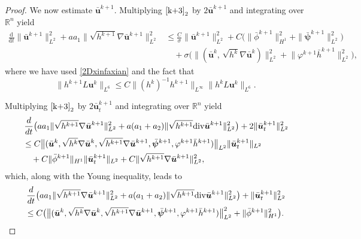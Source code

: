 \documentclass[10pt,a4paper]{amsart}
\begin{document}
\begin{proof}
We now estimate  $\bar{\boldsymbol{u}}^{k+1}$. Multiplying $\eqref{k+3}_2$ by $2\bar{\boldsymbol{u}}^{k+1}$ and integrating over $\mathbb{R}^n$ yield 
\begin{equation}\label{ubar}
\begin{aligned}
\frac{\mathrm{d}}{\mathrm{d}t}\|\bar{\boldsymbol{u}}^{k+1}\|^2_{L^2}\!+\!aa_1\|\sqrt{h^{k+1}}\nabla\bar{\boldsymbol{u}}^{k+1}\|^2_{L^2}&\leq \frac{C}{\sigma}\|\bar{\boldsymbol{u}}^{k+1}\|^2_{L^2}+C\big(\|\bar{\phi}^{k+1}\|^2_{H^1}+\|\bar{\boldsymbol{\psi}}^{k+1}\|^2_{L^2}\big)\\
&\quad +\sigma\big(\|(\bar{\boldsymbol{u}}^{k},\,\sqrt{h^{k}}\nabla\bar{\boldsymbol{u}}^{k})\|^2_{L^2}\!+\!\|\varphi^{k+1}\bar{h}^{k+1}\|^2_{L^2}\big),
\end{aligned}
\end{equation}
where we have used \eqref{2Dxinfaxian} and the fact that
\begin{equation*}
\|h^{k+1}L\boldsymbol{u}^k\|_{L^6}\leq C\|(h^k)^{-1}h^{k+1}\|_{L^\infty}\|h^{k}L\boldsymbol{u}^k\|_{L^6}.    
\end{equation*} 

Multiplying $\eqref{k+3}_2$ by $2\bar{\boldsymbol{u}}_t^{k+1}$ and integrating over $\mathbb{R}^n$ yield 
\begin{equation*} 
\begin{aligned}
&\,\frac{\rm d}{{\rm d}t}\big(a a_1\|\sqrt{h^{k+1}}\nabla\bar{\boldsymbol{u}}^{k+1}\|^2_{L^2}
+a(a_1+a_2)\|\sqrt{h^{k+1}}\mathrm{div}\bar{\boldsymbol{u}}^{k+1}\|^2_{L^2}\big)+2\|\bar{\boldsymbol{u}}^{k+1}_t\|^2_{L^2}\\
&\leq C\big\|(\bar{\boldsymbol{u}}^k,\sqrt{h^k}\nabla\bar{\boldsymbol{u}}^k,\sqrt{h^{k+1}}\nabla\bar{\boldsymbol{u}}^{k+1},\bar{\boldsymbol{\psi}}^{k+1},\varphi^{k+1}\bar{h}^{k+1})\big\|_{L^2}\|\bar{\boldsymbol{u}}^{k+1}_t\|_{L^2}\\
&\quad +C\|\bar{\phi}^{k+1}\|_{H^1} \|\bar{\boldsymbol{u}}^{k+1}_t\|_{L^2} +C\|\sqrt{h^{k+1}}\nabla\bar{\boldsymbol{u}}^{k+1}\|_{L^2}^2,
\end{aligned}
\end{equation*}
which, along with the Young inequality, leads to
\begin{equation}\label{hubar}
\begin{aligned}
&\,\frac{\rm d}{{\rm d}t}\big(a a_1\|\sqrt{h^{k+1}}\nabla\bar{\boldsymbol{u}}^{k+1}\|^2_{L^2}
+a(a_1+a_2)\|\sqrt{h^{k+1}}\mathrm{div}\bar{\boldsymbol{u}}^{k+1}\|^2_{L^2}\big)+\|\bar{\boldsymbol{u}}^{k+1}_t\|^2_{L^2}\\
&\leq C\big(\big\|(\bar{\boldsymbol{u}}^k,
\sqrt{h^k}\nabla\bar{\boldsymbol{u}}^k,\sqrt{h^{k+1}}\nabla\bar{\boldsymbol{u}}^{k+1},\bar{\boldsymbol{\psi}}^{k+1},\varphi^{k+1}\bar{h}^{k+1})\big\|_{L^2}^2+\|\bar{\phi}^{k+1}\|_{H^1}^2 \big).
\end{aligned}
\end{equation}


\end{proof}
\end{document}
